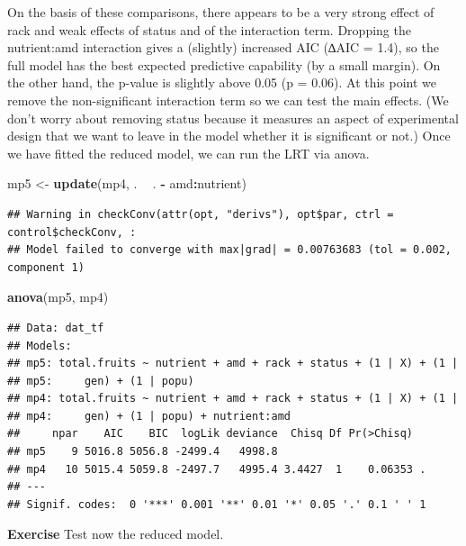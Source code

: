 \documentclass[
  12pt,
]{book}
\newenvironment{Shaded}{\begin{snugshade}}{\end{snugshade}}
\newcommand{\KeywordTok}[1]{\textcolor[rgb]{0.13,0.29,0.53}{\textbf{#1}}}
\newcommand{\NormalTok}[1]{#1}
\newcommand{\OperatorTok}[1]{\textcolor[rgb]{0.81,0.36,0.00}{\textbf{#1}}}
\newcommand{\StringTok}[1]{\textcolor[rgb]{0.31,0.60,0.02}{#1}}
\begin{document}
On the basis of these comparisons, there appears to be a very strong effect of rack and weak effects of status and of the interaction term. Dropping the nutrient:amd interaction gives a (slightly) increased AIC (∆AIC = 1.4), so the full model has the best expected predictive capability (by a small margin). On the other hand, the p-value is slightly above 0.05 (p = 0.06). At this point we remove the non-significant interaction term so we can test the main effects. (We don't worry about removing status because it measures an aspect of experimental design that we want to leave in the model whether it is significant or not.) Once we have fitted the reduced model, we can run the LRT via anova.

\begin{Shaded}
\begin{Highlighting}[]
\NormalTok{mp5 <-}\StringTok{ }\KeywordTok{update}\NormalTok{(mp4, . }\OperatorTok{~}\StringTok{ }\NormalTok{. }\OperatorTok{-}\StringTok{ }\NormalTok{amd}\OperatorTok{:}\NormalTok{nutrient)}
\end{Highlighting}
\end{Shaded}

\begin{verbatim}
## Warning in checkConv(attr(opt, "derivs"), opt$par, ctrl = control$checkConv, :
## Model failed to converge with max|grad| = 0.00763683 (tol = 0.002, component 1)
\end{verbatim}

\begin{Shaded}
\begin{Highlighting}[]
\KeywordTok{anova}\NormalTok{(mp5, mp4)}
\end{Highlighting}
\end{Shaded}

\begin{verbatim}
## Data: dat_tf
## Models:
## mp5: total.fruits ~ nutrient + amd + rack + status + (1 | X) + (1 | 
## mp5:     gen) + (1 | popu)
## mp4: total.fruits ~ nutrient + amd + rack + status + (1 | X) + (1 | 
## mp4:     gen) + (1 | popu) + nutrient:amd
##     npar    AIC    BIC  logLik deviance  Chisq Df Pr(>Chisq)  
## mp5    9 5016.8 5056.8 -2499.4   4998.8                       
## mp4   10 5015.4 5059.8 -2497.7   4995.4 3.4427  1    0.06353 .
## ---
## Signif. codes:  0 '***' 0.001 '**' 0.01 '*' 0.05 '.' 0.1 ' ' 1
\end{verbatim}

\textbf{Exercise}
Test now the reduced model.
\end{document}
